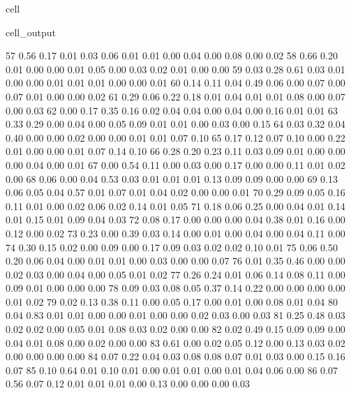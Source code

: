 \documentclass[letterpaper,10pt,english]{jupyterBook}
\begin{document}
\begin{sphinxuseclass}{cell}
\begin{sphinxVerbatimOutput}
\begin{sphinxuseclass}{cell_output}
\begin{sphinxVerbatim}[commandchars=\\\{\}]
        57	0.56 	0.17 	0.01 	0.03 	0.06 	0.01 	0.01 	0.00 	0.04 	0.00 	0.08 	0.00 	0.02
        58	0.66 	0.20 	0.01 	0.00 	0.00 	0.01 	0.05 	0.00 	0.03 	0.02 	0.01 	0.00 	0.00
        59	0.03 	0.28 	0.61 	0.03 	0.01 	0.00 	0.00 	0.01 	0.01 	0.01 	0.00 	0.00 	0.01
        60	0.14 	0.11 	0.04 	0.49 	0.06 	0.00 	0.07 	0.00 	0.07 	0.01 	0.00 	0.00 	0.02
        61	0.29 	0.06 	0.22 	0.18 	0.01 	0.04 	0.01 	0.01 	0.08 	0.00 	0.07 	0.00 	0.03
        62	0.00 	0.17 	0.35 	0.16 	0.02 	0.04 	0.04 	0.00 	0.04 	0.00 	0.16 	0.01 	0.01
        63	0.33 	0.29 	0.00 	0.04 	0.00 	0.05 	0.09 	0.01 	0.01 	0.00 	0.03 	0.00 	0.15
        64	0.03 	0.32 	0.04 	0.40 	0.00 	0.00 	0.02 	0.00 	0.00 	0.01 	0.01 	0.07 	0.10
        65	0.17 	0.12 	0.07 	0.10 	0.00 	0.22 	0.01 	0.00 	0.00 	0.01 	0.07 	0.14 	0.10
        66	0.28 	0.20 	0.23 	0.11 	0.03 	0.09 	0.01 	0.00 	0.00 	0.00 	0.04 	0.00 	0.01
        67	0.00 	0.54 	0.11 	0.00 	0.03 	0.00 	0.17 	0.00 	0.00 	0.11 	0.01 	0.02 	0.00
        68	0.06 	0.00 	0.04 	0.53 	0.03 	0.01 	0.01 	0.01 	0.13 	0.09 	0.09 	0.00 	0.00
        69	0.13 	0.06 	0.05 	0.04 	0.57 	0.01 	0.07 	0.01 	0.04 	0.02 	0.00 	0.00 	0.01
        70	0.29 	0.09 	0.05 	0.16 	0.11 	0.01 	0.00 	0.02 	0.06 	0.02 	0.14 	0.01 	0.05
        71	0.18 	0.06 	0.25 	0.00 	0.04 	0.01 	0.14 	0.01 	0.15 	0.01 	0.09 	0.04 	0.03
        72	0.08 	0.17 	0.00 	0.00 	0.00 	0.04 	0.38 	0.01 	0.16 	0.00 	0.12 	0.00 	0.02
        73	0.23 	0.00 	0.39 	0.03 	0.14 	0.00 	0.01 	0.00 	0.04 	0.00 	0.04 	0.11 	0.00
        74	0.30 	0.15 	0.02 	0.00 	0.09 	0.00 	0.17 	0.09 	0.03 	0.02 	0.02 	0.10 	0.01
        75	0.06 	0.50 	0.20 	0.06 	0.04 	0.00 	0.01 	0.01 	0.00 	0.03 	0.00 	0.00 	0.07
        76	0.01 	0.35 	0.46 	0.00 	0.00 	0.02 	0.03 	0.00 	0.04 	0.00 	0.05 	0.01 	0.02
        77	0.26 	0.24 	0.01 	0.06 	0.14 	0.08 	0.11 	0.00 	0.09 	0.01 	0.00 	0.00 	0.00
        78	0.09 	0.03 	0.08 	0.05 	0.37 	0.14 	0.22 	0.00 	0.00 	0.00 	0.00 	0.01 	0.02
        79	0.02 	0.13 	0.38 	0.11 	0.00 	0.05 	0.17 	0.00 	0.01 	0.00 	0.08 	0.01 	0.04
        80	0.04 	0.83 	0.01 	0.01 	0.00 	0.00 	0.01 	0.00 	0.00 	0.02 	0.03 	0.00 	0.03
        81	0.25 	0.48 	0.03 	0.02 	0.02 	0.00 	0.05 	0.01 	0.08 	0.03 	0.02 	0.00 	0.00
        82	0.02 	0.49 	0.15 	0.09 	0.09 	0.00 	0.04 	0.01 	0.08 	0.00 	0.02 	0.00 	0.00
        83	0.61 	0.00 	0.02 	0.05 	0.12 	0.00 	0.13 	0.03 	0.02 	0.00 	0.00 	0.00 	0.00
        84	0.07 	0.22 	0.04 	0.03 	0.08 	0.08 	0.07 	0.01 	0.03 	0.00 	0.15 	0.16 	0.07
        85	0.10 	0.64 	0.01 	0.10 	0.01 	0.00 	0.01 	0.01 	0.00 	0.01 	0.04 	0.06 	0.00
        86	0.07 	0.56 	0.07 	0.12 	0.01 	0.01 	0.01 	0.00 	0.13 	0.00 	0.00 	0.00 	0.03

\end{sphinxVerbatim}
\end{sphinxuseclass}
\end{sphinxVerbatimOutput}
\end{sphinxuseclass}
\end{document}
